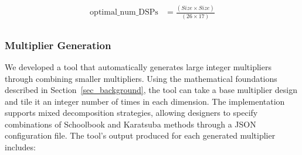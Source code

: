 \documentclass[conference]{IEEEtran}
\begin{document}
\begin{equation} \label{eq_mul_best}
\begin{split}
\text{optimal\_num\_DSPs} &= \frac{(Size \times Size)}{(26 \times 17)}\\ 
\end{split}
\end{equation}

\begin{table}
\centering
\caption{AMD IP Multiplier vs Proposed Primitive Multiplier}
\label{table_primitive_vs_ip}
\end{table}



\subsubsection{Multiplier Generation}

We developed a tool that automatically generates large integer multipliers through combining smaller multipliers.
Using the mathematical foundations described in Section~\ref{sec_background}, the tool can take a base multiplier design and tile it an integer number of times in each dimension.
The implementation supports mixed decomposition strategies, allowing designers to specify combinations of Schoolbook and Karatsuba methods through a JSON configuration file.
The tool's output produced for each generated multiplier includes:  
\end{document}
